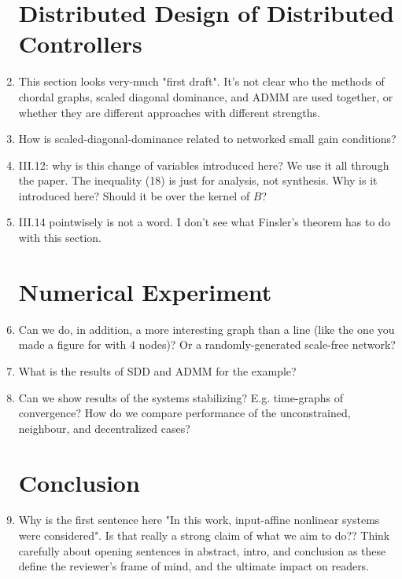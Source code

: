 \documentclass[11pt]{article}
\begin{document}
\begin{enumerate}
\section{Distributed Design of Distributed Controllers}
\item This section looks very-much "first draft". It's not clear who the methods of chordal graphs, scaled diagonal dominance, and ADMM are used together, or whether they are different approaches with different strengths.
\item How is scaled-diagonal-dominance related to networked small gain conditions?
\item III.12: why is this change of variables introduced here? We use it all through the paper. The inequality (18) is just for analysis, not synthesis. Why is it introduced here? Should it be over the kernel of $B$?
\item III.14 pointwisely is not a word. I don't see what Finsler's theorem has to do with this section.
\section{Numerical Experiment}
\item Can we do, in addition, a more interesting graph than a line (like the one you made a figure for with 4 nodes)? Or a randomly-generated scale-free network?
\item What is the results of SDD and ADMM for the example?
\item Can we show results of the systems stabilizing? E.g. time-graphs of convergence? How do we compare performance of the unconstrained, neighbour, and decentralized cases?
\section{Conclusion}
\item Why is the first sentence here "In this work, input-affine nonlinear systems were considered". Is that really a strong claim of what we aim to do?? Think carefully about opening sentences in abstract, intro, and conclusion as these define the reviewer's frame of mind, and the ultimate impact on readers.

	
	
	\end{enumerate}
\end{document}
